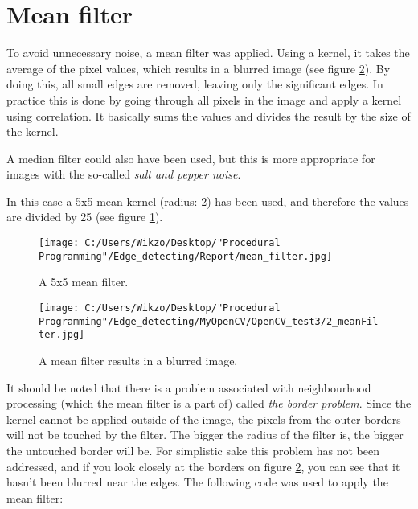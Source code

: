\section{Mean filter}
To avoid unnecessary noise, a mean filter was applied. Using a kernel, it takes the average of the pixel values, which results in a blurred image (see figure \ref{mean_blur}). By doing this, all small edges are removed, leaving only the significant edges. In practice this is done by going through all pixels in the image and apply a kernel using correlation. It basically sums the values and divides the result by the size of the kernel.

A median filter could also have been used, but this is more appropriate for images with the so-called \textit{salt and pepper noise}.

In this case a 5x5 mean kernel (radius: 2) has been used, and therefore the values are divided by 25 (see figure \ref{mean_filter_kernel}).

\begin{figure} [htbp]
\texttt{[image: C:/Users/Wikzo/Desktop/"Procedural Programming"/Edge\_detecting/Report/mean\_filter.jpg]}
\centering
\caption{A 5x5 mean filter.}
\label{mean_filter_kernel}
\end{figure}

\begin{figure} [htbp]
\texttt{[image: C:/Users/Wikzo/Desktop/"Procedural Programming"/Edge\_detecting/MyOpenCV/OpenCV\_test3/2\_meanFilter.jpg]}
\centering
\caption{A mean filter results in a blurred image.}
\label{mean_blur}
\end{figure}

It should be noted that there is a problem associated with neighbourhood processing (which the mean filter is a part of) called \textit{the border problem}. Since the kernel cannot be applied outside of the image, the pixels from the outer borders will not be touched by the filter. The bigger the radius of the filter is, the bigger the untouched border will be. \citep{ip_book} For simplistic sake this problem has not been addressed, and if you look closely at the borders on figure \ref{mean_blur}, you can see that it hasn't been blurred near the edges. The following code was used to apply the mean filter:

